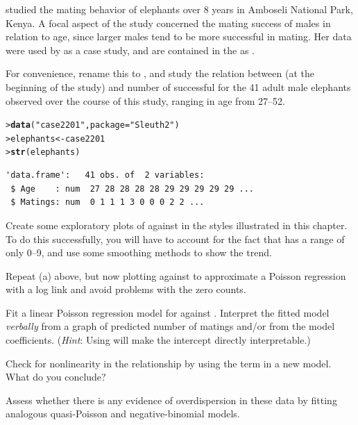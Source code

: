 \documentclass[11pt]{report}\usepackage[]{graphicx}\usepackage[]{color}
\makeatletter
\newcommand{\hlstr}[1]{\textcolor[rgb]{0.192,0.494,0.8}{#1}}%
\newcommand{\hlstd}[1]{\textcolor[rgb]{0.345,0.345,0.345}{#1}}%
\newcommand{\hlkwb}[1]{\textcolor[rgb]{0.69,0.353,0.396}{#1}}%
\newcommand{\hlkwc}[1]{\textcolor[rgb]{0.333,0.667,0.333}{#1}}%
\newcommand{\hlkwd}[1]{\textcolor[rgb]{0.737,0.353,0.396}{\textbf{#1}}}%
\newenvironment{kframe}{%
 \def\at@end@of@kframe{}%
 \ifinner\ifhmode%
  \def\at@end@of@kframe{\end{minipage}}%
  \begin{minipage}{\columnwidth}%
 \fi\fi%
 \def\FrameCommand##1{\hskip\@totalleftmargin \hskip-\fboxsep
 \colorbox{shadecolor}{##1}\hskip-\fboxsep
     \hskip-\linewidth \hskip-\@totalleftmargin \hskip\columnwidth}%
 \MakeFramed {\advance\hsize-\width
   \@totalleftmargin\z@ \linewidth\hsize
   \@setminipage}}%
 {\par\unskip\endMakeFramed%
 \at@end@of@kframe}
\newenvironment{knitrout}{}{} %
\renewenvironment{knitrout}{\small\renewcommand{\baselinestretch}{.85}}{} %
\makeatother
\begin{document}
\begin{Exercises}

  \exercise \citet{Poole:1989} studied the mating behavior of elephants over 8 years in Amboseli National Park,
  Kenya. A focal aspect of the study concerned the mating success of males in relation to age, since larger
  males tend to be more successful in mating.  Her data were used by \citet[]{RamseySchafer:2002} 
  as a case study, and are contained in the  \citep{Sleuth2} as .

  For convenience, rename this to , and study the relation between  
  (at the beginning of the study) and number of successful 
  for the 41 adult male elephants observed over the course of this study, ranging in age from 27--52.
\begin{knitrout}
\color{fgcolor}\begin{kframe}
\begin{alltt}
\hlstd{> }\hlkwd{data}\hlstd{(}\hlstr{"case2201"}\hlstd{,} \hlkwc{package}\hlstd{=}\hlstr{"Sleuth2"}\hlstd{)}
\hlstd{> }\hlstd{elephants} \hlkwb{<-} \hlstd{case2201}
\hlstd{> }\hlkwd{str}\hlstd{(elephants)}
\end{alltt}
\begin{verbatim}
'data.frame':	41 obs. of  2 variables:
 $ Age    : num  27 28 28 28 28 29 29 29 29 29 ...
 $ Matings: num  0 1 1 1 3 0 0 0 2 2 ...
\end{verbatim}
\end{kframe}
\end{knitrout}
  \begin{enumerate*}
    \item Create some exploratory plots of  against  in the styles illustrated in this chapter.
    To do this successfully, you will have to account for the fact that  has a range of only
    0--9, and use some smoothing methods to show the trend.
    \item Repeat (a) above, but now plotting  against  to approximate a
    Poisson regression with a log link and avoid problems with the zero counts.
    \item Fit a linear Poisson regression model for  against .  Interpret the
    fitted model \emph{verbally} from a graph of predicted number of matings and/or from the model
    coefficients. (\emph{Hint}: Using  will make the intercept directly interpretable.)
    \item Check for nonlinearity in the relationship by using the term  in a new
    model.  What do you conclude?
    \item Assess whether there is any evidence of overdispersion in these data by fitting analogous
    quasi-Poisson and negative-binomial models.
  \end{enumerate*}


\end{Exercises}
\end{document}
